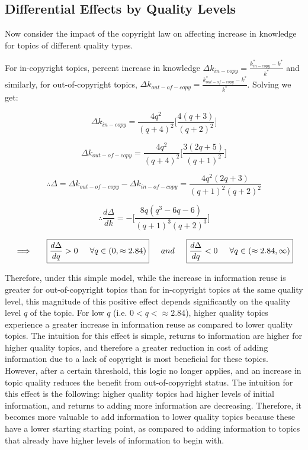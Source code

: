 \subsection*{Differential Effects by Quality Levels}

Now consider the impact of the copyright law on affecting increase in knowledge for topics of different quality types.

For in-copyright topics, percent increase in knowledge $\Delta k_{in-copy}=\frac{k^*_{in-copy}-k^*}{k^*}$ and similarly, for out-of-copyright topics, $\Delta k_{out-of-copy}=\frac{k^*_{out-of-copy}-k^*}{k^*}$. Solving we get:

$$ \Delta k_{in-copy} = \frac{4q^2}{(q+4)^2} \Big[ \frac{4(q+3)}{(q+2)^2} \Big] $$

$$ \Delta k_{out-of-copy} = \frac{4q^2}{(q+4)^2} \Big[ \frac{3(2q+5)}{(q+1)^2} \Big] $$

$$ \therefore \Delta = \Delta k_{out-of-copy} - \Delta k_{in-of-copy} = \frac{4q^2 (2q+3)}{(q+1)^2(q+2)^2} $$


$$ \therefore \frac{d\Delta}{dk} = - \Big[ \frac{8q(q^3-6q-6)}{(q+1)^3(q+2)^3} \Big] $$


$$ \implies \hspace{5mm} \boxed{\frac{d\Delta}{dq} > 0 \hspace{5mm} \forall q \in (0, \approx 2.84)}  \hspace{5mm} and \hspace{5mm} \boxed{\frac{d\Delta}{dq} < 0 \hspace{5mm} \forall q \in (\approx 2.84,\infty)}$$

Therefore, under this simple model, while the increase in information reuse is greater for out-of-copyright topics than for in-copyright topics at the same quality level, this magnitude of this positive effect depends significantly on the quality level $q$ of the topic. For low $q$ (i.e. $0<q<\approx2.84$), higher quality topics experience a greater increase in information reuse as compared to lower quality topics. The intuition for this effect is simple, returns to information are higher for higher quality topics, and therefore a greater reduction in cost of adding information due to a lack of copyright is most beneficial for these topics. However, after a certain threshold, this logic no longer applies, and an increase in topic quality reduces the benefit from out-of-copyright status. The intuition for this effect is the following: higher quality topics had higher levels of initial information, and returns to adding more information are decreasing. Therefore, it becomes more valuable to add information to lower quality topics because these have a lower starting starting point, as compared to adding information to topics that already have higher levels of information to begin with.

